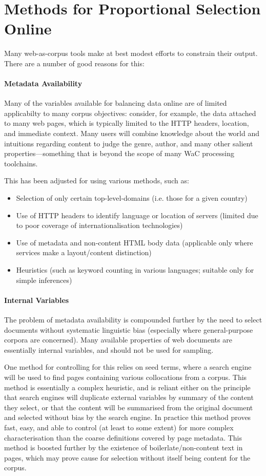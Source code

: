 \section{Methods for Proportional Selection Online}
Many web-as-corpus tools make at best modest efforts to constrain their output.  There are a number of good reasons for this:

\paragraph{Metadata Availability}
Many of the variables available for balancing data online are of limited applicabilty to many corpus objectives: consider, for example, the data attached to many web pages, which is typically limited to the HTTP headers, location, and immediate context.  Many users will combine knowledge about the world and intuitions regarding content to judge the genre, author, and many other salient properties---something that is beyond the scope of many WaC processing toolchains.

This has been adjusted for using various methods, such as:

\begin{itemize}
    \item Selection of only certain top-level-domains (i.e. those for a given country)
    \item Use of HTTP headers to identify language or location of servers (limited due to poor coverage of internationalisation technologies)
    \item Use of metadata and non-content HTML body data (applicable only where services make a layout/content distinction)
    \item Heuristics (such as keyword counting in various languages; suitable only for simple inferences)
\end{itemize}


\paragraph{Internal Variables}
The problem of metadata availability is compounded further by the need to select documents without systematic linguistic bias (especially where general-purpose corpora are concerned).  Many available properties of web documents are essentially internal variables, and should not be used for sampling.

One method for controlling for this relies on seed terms, where a search engine will be used to find pages containing various collocations from a corpus.  This method is essentially a complex heuristic, and is reliant either on the principle that search engines will duplicate external variables by summary of the content they select, or that the content will be summarised from the original document and selected without bias by the search engine.  In practice this method proves fast, easy, and able to control (at least to some extent) for more complex characterisation than the coarse definitions covered by page metadata.  This method is boosted further by the existence of boilerlate/non-content text in pages, which may prove cause for selection without itself being content for the corpus.

